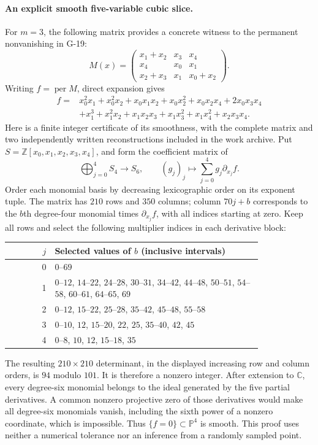 \paragraph{An explicit smooth five-variable cubic slice.}
For $m=3$, the following matrix provides a concrete witness to
the permanent nonvanishing in G-19:
\[
 M(x)=\begin{pmatrix}
 x_1+x_2&x_3&x_4\\
 x_4&x_0&x_1\\
 x_2+x_3&x_1&x_0+x_2
 \end{pmatrix}.
\]
Writing $f=\operatorname{per}M$, direct expansion gives
\begin{align*}
 f={}&x_0^2x_1+x_0^2x_2+x_0x_1x_2+x_0x_2^2
        +x_0x_2x_4+2x_0x_3x_4\\
    &+x_1^3+x_1^2x_2+x_1x_2x_3+x_1x_3^2
        +x_1x_4^2+x_2x_3x_4.
\end{align*}
Here is a finite integer certificate of its smoothness, with the
complete matrix and two independently written reconstructions
included in the work archive. Put
$S=\mathbb Z[x_0,x_1,x_2,x_3,x_4]$, and form the coefficient
matrix of
\[
 \bigoplus_{j=0}^4 S_4\longrightarrow S_6,
 \qquad (g_j)_j\longmapsto\sum_{j=0}^4g_j\partial_{x_j}f.
\]
Order each monomial basis by decreasing lexicographic order on
its exponent tuple. The matrix has $210$ rows and $350$ columns;
column $70j+b$ corresponds to the $b$th degree-four monomial
times $\partial_{x_j}f$, with all indices starting at zero.
Keep all rows and select the following multiplier indices in
each derivative block:
\begin{center}
\begin{tabular}{r p{0.82\linewidth}}
\toprule
$j$ & Selected values of $b$ (inclusive intervals)\\
\midrule
0 & $0$--$69$\\
1 & $0$--$12$, $14$--$22$, $24$--$28$, $30$--$31$,
    $34$--$42$, $44$--$48$, $50$--$51$, $54$--$58$,
    $60$--$61$, $64$--$65$, $69$\\
2 & $0$--$12$, $15$--$22$, $25$--$28$, $35$--$42$,
    $45$--$48$, $55$--$58$\\
3 & $0$--$10$, $12$, $15$--$20$, $22$, $25$,
    $35$--$40$, $42$, $45$\\
4 & $0$--$8$, $10$, $12$, $15$--$18$, $35$\\
\bottomrule
\end{tabular}
\end{center}
The resulting $210\times210$ determinant, in the displayed
increasing row and column orders, is $94$ modulo $101$.
It is therefore a nonzero integer. After extension to
$\mathbb C$, every degree-six monomial belongs to the ideal
generated by the five partial derivatives. A common nonzero
projective zero of those derivatives would make all degree-six
monomials vanish, including the sixth power of a nonzero
coordinate, which is impossible. Thus $\{f=0\}\subset\mathbb P^4$
is smooth. This proof uses neither a numerical tolerance nor an
inference from a randomly sampled point.

